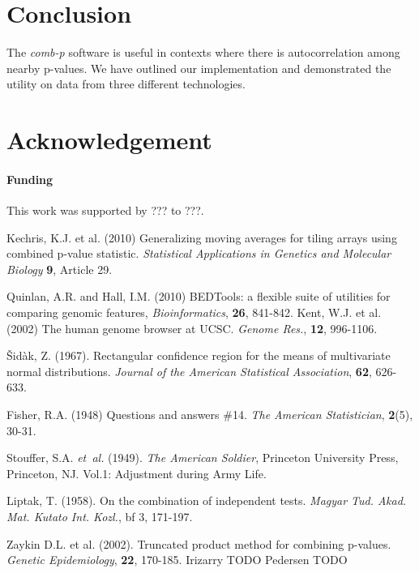 \documentclass{bioinfo}
\begin{document}
\section{Conclusion}
The \textit{comb-p} software is useful in contexts where there is
autocorrelation among nearby p-values. We have outlined our implementation
and demonstrated the utility on data from three different technologies.

\section*{Acknowledgement}

\paragraph{Funding\textcolon} This work was supported by ??? to ???.

%
%
%
%
%

%

%
\begin{thebibliography}{}

 Kechris, K.J. et al. (2010)
Generalizing moving averages for tiling arrays using combined p-value
statistic. {\it Statistical Applications in Genetics and Molecular Biology}
{\bf 9}, Article 29.

 Quinlan, A.R. and Hall, I.M. (2010) BEDTools: a flexible suite of utilities for comparing genomic features, {\it Bioinformatics}, {\bf 26}, 841-842.
 Kent, W.J. et al. (2002) The human genome browser at UCSC. {\it Genome Res.}, {\bf 12}, 996-1106.

Šidàk, Z. (1967).
Rectangular conﬁdence region for the means of multivariate normal distributions.
\textit{Journal of the American Statistical Association}, {\bf 62}, 626-633.

Fisher, R.A. (1948)
Questions and answers \#14.
{\it The American Statistician}, {\bf 2}(5), 30-31.

Stouffer, S.A. \textit{et~al.} (1949). \textit{The American Soldier},
Princeton University Press, Princeton, NJ. Vol.1: Adjustment during Army Life.

Liptak, T. (1958). On the combination of independent tests. {\it Magyar Tud. Akad. Mat. Kutato Int. Kozl.}, {bf 3}, 171-197.

 Zaykin D.L. et al. (2002).
Truncated product method for combining p-values. {\it Genetic Epidemiology},
{\bf 22}, 170-185.
 Irizarry TODO
 Pedersen TODO

\end{thebibliography}
\end{document}
